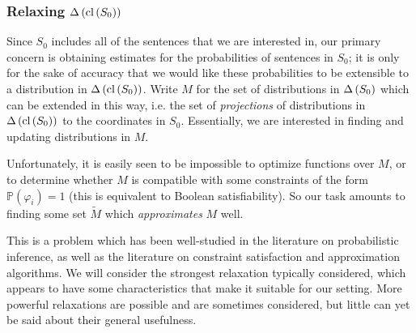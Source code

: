 \documentclass[12pt]{article}
\newtheorem{theorem}{Theorem}
\theoremstyle{definition}
\newcommand{\of}[1]{\left(#1\right)}
\renewcommand{\b}[1]{\left\{#1\right\}}
\newcommand{\ofc}[2]{\left(#1\;\middle\vert\;#2\right)}
\newcommand{\PP}{\mathbb{P}}
\newcommand{\Pc}[2]{\PP\ofc{#1}{#2}}
\renewcommand{\P}[1]{\mathbb{P}\of{#1}}
\newcommand{\vp}{\varphi}
\begin{document}
%

\subsubsection{Relaxing $\D{\clS}$}

Since $S_0$ includes all of the sentences
that we are interested in, our primary concern is obtaining estimates
for the probabilities of sentences in $S_0$;
it is only for the sake of accuracy
that we would like these probabilities to be extensible
to a distribution in $\D{\clS}$.
Write $M$ for the set of distributions in $\D{S_0}$ which can be extended in this way,
i.e. the set of \emph{projections} of distributions in $\D{\clS}$
to the coordinates in $S_0$.
Essentially, we are interested in finding and updating distributions in $M$.

Unfortunately, it is easily seen to be impossible to optimize
functions over $M$, or to determine whether $M$ is compatible
with some constraints of the form $\P{\vp_i} = 1$ (this is equivalent to Boolean satisfiability).
So our task amounts to finding some set $\widetilde{M}$ which \emph{approximates} $M$ well.

This is a problem which has been well-studied in the literature on probabilistic inference,
as well as the literature on constraint satisfaction and approximation algorithms.
We will consider the strongest relaxation typically considered,
which appears to have some characteristics that make it suitable for our setting.
More powerful relaxations are possible and are sometimes considered,
but little can yet be said about their general usefulness.
\end{document}
